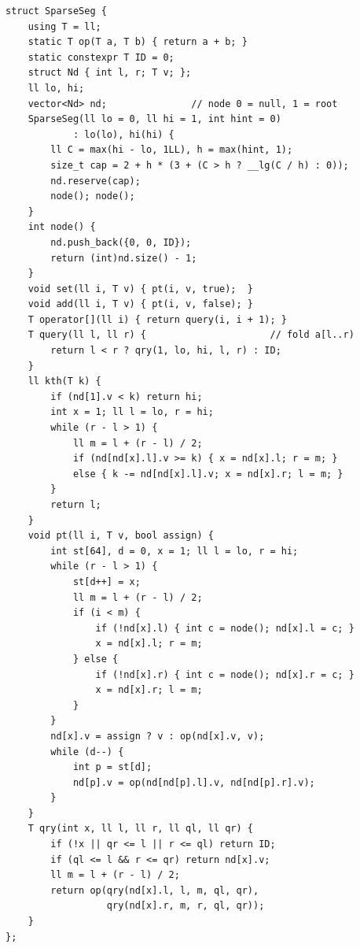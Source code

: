 \begin{lstlisting}
struct SparseSeg {
    using T = ll;
    static T op(T a, T b) { return a + b; }
    static constexpr T ID = 0;
    struct Nd { int l, r; T v; };
    ll lo, hi;
    vector<Nd> nd;               // node 0 = null, 1 = root
    SparseSeg(ll lo = 0, ll hi = 1, int hint = 0)
            : lo(lo), hi(hi) {
        ll C = max(hi - lo, 1LL), h = max(hint, 1);
        size_t cap = 2 + h * (3 + (C > h ? __lg(C / h) : 0));
        nd.reserve(cap);
        node(); node();
    }
    int node() {
        nd.push_back({0, 0, ID});
        return (int)nd.size() - 1;
    }
    void set(ll i, T v) { pt(i, v, true);  }
    void add(ll i, T v) { pt(i, v, false); }
    T operator[](ll i) { return query(i, i + 1); }
    T query(ll l, ll r) {                      // fold a[l..r)
        return l < r ? qry(1, lo, hi, l, r) : ID;
    }
    ll kth(T k) {
        if (nd[1].v < k) return hi;
        int x = 1; ll l = lo, r = hi;
        while (r - l > 1) {
            ll m = l + (r - l) / 2;
            if (nd[nd[x].l].v >= k) { x = nd[x].l; r = m; }
            else { k -= nd[nd[x].l].v; x = nd[x].r; l = m; }
        }
        return l;
    }
    void pt(ll i, T v, bool assign) {
        int st[64], d = 0, x = 1; ll l = lo, r = hi;
        while (r - l > 1) {
            st[d++] = x;
            ll m = l + (r - l) / 2;
            if (i < m) {
                if (!nd[x].l) { int c = node(); nd[x].l = c; }
                x = nd[x].l; r = m;
            } else {
                if (!nd[x].r) { int c = node(); nd[x].r = c; }
                x = nd[x].r; l = m;
            }
        }
        nd[x].v = assign ? v : op(nd[x].v, v);
        while (d--) {
            int p = st[d];
            nd[p].v = op(nd[nd[p].l].v, nd[nd[p].r].v);
        }
    }
    T qry(int x, ll l, ll r, ll ql, ll qr) {
        if (!x || qr <= l || r <= ql) return ID;
        if (ql <= l && r <= qr) return nd[x].v;
        ll m = l + (r - l) / 2;
        return op(qry(nd[x].l, l, m, ql, qr),
                  qry(nd[x].r, m, r, ql, qr));
    }
};
\end{lstlisting}

